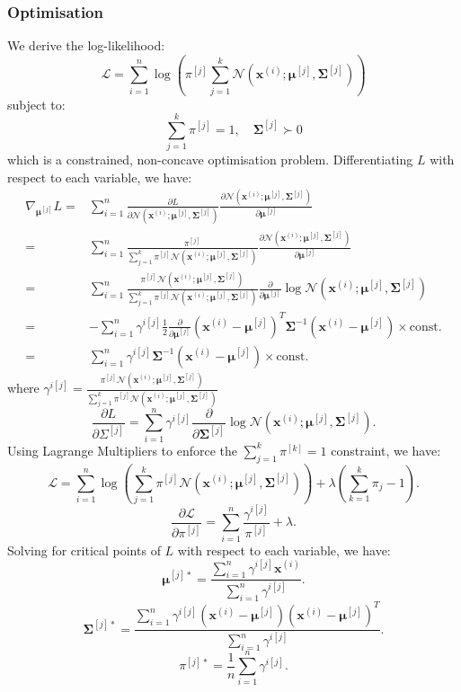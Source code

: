 \subsubsection{Optimisation}
We derive the log-likelihood:
\[\mathcal{L}=\sum_{i=1}^{n} \log\left( \pi^{[j]}\sum_{j=1}^{k}
\mathcal{N}\left( \mathbf{x}^{(i)};\mathbf{\mu}^{[j]},\mathbf{\Sigma}^{[j]}
\right) \right)\]
subject to:
\[\sum_{j=1}^{k} \pi^{[j]}=1,\quad\mathbf{\Sigma}^{[j]}\succ 0\] 
which is a constrained, non-concave optimisation problem.
Differentiating $L$ with respect to each variable, we have:
\begin{align*}
  \nabla_{\mathbf{\mu}^{[j]}} L=&\sum_{i=1}^{n} \frac{\partial L}{\partial \mathcal{N}\left(\mathbf{x}^{(i)};\mathbf{\mu}^{[j]},\mathbf{\Sigma}^{[j]}\right)} \frac{\partial \mathcal{N}\left(\mathbf{x}^{(i)};\mathbf{\mu}^{[j]},\mathbf{\Sigma}^{[j]}\right)}{\partial \mathbf{\mu}^{[j]}}\\
  =&\sum_{i=1}^{n} \frac{\pi^{[j]}}{\sum_{j=1}^{k} \pi^{[j]}\mathcal{N}\left(\mathbf{x}^{(i)};\mathbf{\mu}^{[j]},\mathbf{\Sigma}^{[j]}\right)}\frac{\partial \mathcal{N}\left(\mathbf{x}^{(i)};\mathbf{\mu}^{[j]},\mathbf{\Sigma}^{[j]}\right)}{\partial \mathbf{\mu}^{[j]}} \\
  =&\sum_{i=1}^{n} \frac{\pi^{[j]}\mathcal{N}\left(\mathbf{x}^{(i)};\mathbf{\mu}^{[j]},\mathbf{\Sigma}^{[j]}\right)}{\sum_{j=1}^{k} \pi^{[j]}\mathcal{N}\left(\mathbf{x}^{(i)};\mathbf{\mu}^{[j]},\mathbf{\Sigma}^{[j]}\right)}\frac{\partial}{\partial \mathbf{\mu}^{[j]}} \log\mathcal{N}\left(\mathbf{x}^{(i)};\mathbf{\mu}^{[j]},\mathbf{\Sigma}^{[j]}\right)\\
  =&-\sum_{i=1}^{n} \gamma^{i[j]}\frac{1}{2}\frac{\partial}{\partial \mathbf{\mu}^{[j]}} {\left( \mathbf{x}^{(i)}-\mathbf{\mu}^{[j]} \right) }^{T}\mathbf{\Sigma}^{-1}\left( \mathbf{x}^{(i)}-\mathbf{\mu}^{[j]}\right) \times \text{const.}\\
  =&\sum_{i=1}^{n} \gamma^{i[j]}\mathbf{\Sigma}^{-1}\left( \mathbf{x}^{(i)}-\mathbf{\mu}^{[j]}\right) \times \text{const.}
\end{align*}
where $\gamma^{i[j]}=\frac{\pi^{[j]}\mathcal{N}\left(\mathbf{x}^{(i)};\mathbf{\mu}^{[j]},\mathbf{\Sigma}^{[j]}\right)}{\sum_{j=1}^{k} \pi^{[j]}\mathcal{N}\left(\mathbf{x}^{(i)};\mathbf{\mu}^{[j]},\mathbf{\Sigma}^{[j]}\right)}$
\[\frac{\partial L}{\partial \Sigma^{[j]}}=\sum_{i=1}^{n} \gamma^{i[j]}\frac{\partial}{\partial \mathbf{\Sigma}^{[j]}} \log\mathcal{N}\left(\mathbf{x}^{(i)};\mathbf{\mu}^{[j]},\mathbf{\Sigma}^{[j]}\right).\]
Using Lagrange Multipliers to enforce the $\sum_{j=1}^{k} \pi^{[k]}=1$
constraint, we have:
\[\mathcal{L}=\sum_{i=1}^{n} \log\left( \sum_{j=1}^{k} \pi^{[j]}\mathcal{N}\left(\mathbf{x}^{(i)};\mathbf{\mu}^{[j]},\mathbf{\Sigma}^{[j]}\right) \right) +\lambda\left( \sum_{k=1}^{k} \pi_j-1 \right).\] 
\[\frac{\partial \mathcal{L}}{\partial \pi^{[j]}} =\sum_{i=1}^{n} \frac{\gamma^{i[j]}}{\pi^{[j]}}+\lambda.\] 
Solving for critical points of $L$ with respect to each variable, we have:
\[\mathbf{\mu}^{[j]*}=\frac{\sum_{i=1}^{n} \gamma^{i[j]}\mathbf{x}^{(i)}}{\sum_{i=1}^{n} \gamma^{i[j]}}.\] 
\[\mathbf{\Sigma}^{[j]*}=\frac{\sum_{i=1}^{n} \gamma^{i[j]}{\left(\mathbf{x}^{(i)}-\mathbf{\mu}^{[j]}\right)} {\left(\mathbf{x}^{(i)}-\mathbf{\mu}^{[j]}\right)}^{T}}{\sum_{i=1}^{n} \gamma^{i[j]}}.\] 
\[\pi^{[j]*}=\frac{1}{n}\sum_{i=1}^{n} \gamma^{i[j]}.\] 

